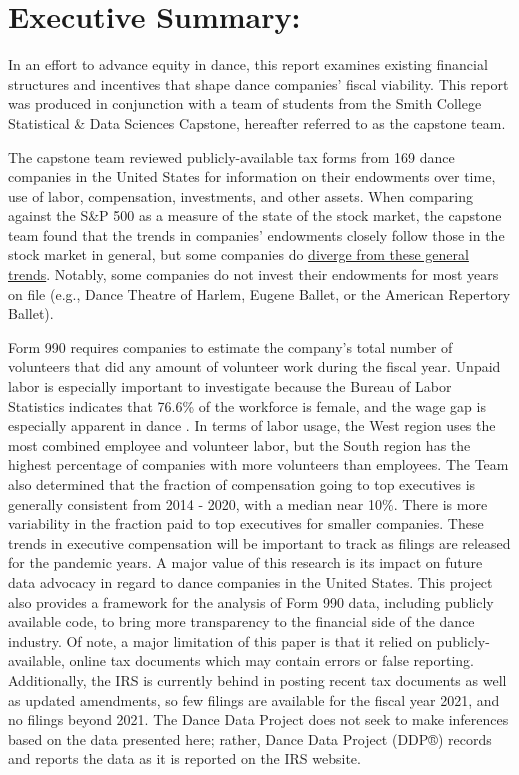 \documentclass[Dance Data
Project,article,submit,moreauthors,pdftex]{mdpi}
\begin{document}

\hypertarget{executive-summary}{%
\section{Executive Summary:}\label{executive-summary}}

In an effort to advance equity in dance, this report examines existing
financial structures and incentives that shape dance companies' fiscal
viability. This report was produced in conjunction with a team of
students from the Smith College Statistical \& Data Sciences Capstone,
hereafter referred to as the capstone team.

The capstone team reviewed publicly-available tax forms from 169 dance
companies in the United States for information on their endowments over
time, use of labor, compensation, investments, and other assets. When
comparing against the S\&P 500 as a measure of the state of the stock
market, the capstone team found that the trends in companies' endowments
closely follow those in the stock market in general, but some companies
do \protect\hyperlink{endowment-time}{diverge from these general
trends}. Notably, some companies do not invest their endowments for most
years on file (e.g., Dance Theatre of Harlem, Eugene Ballet, or the
American Repertory Ballet).

Form 990 requires companies to estimate the company's total number of
volunteers that did any amount of volunteer work during the fiscal year.
Unpaid labor is especially important to investigate because the Bureau
of Labor Statistics indicates that 76.6\% of the workforce is female,
and the wage gap is especially apparent in dance
\citep{jikar_gender_2022}. In terms of labor usage, the West region uses
the most combined employee and volunteer labor, but the South region has
the highest percentage of companies with more volunteers than employees.
The Team also determined that the fraction of compensation going to top
executives is generally consistent from 2014 - 2020, with a median near
10\%. There is more variability in the fraction paid to top executives
for smaller companies. These trends in executive compensation will be
important to track as filings are released for the pandemic years. A
major value of this research is its impact on future data advocacy in
regard to dance companies in the United States. This project also
provides a framework for the analysis of Form 990 data, including
publicly available code, to bring more transparency to the financial
side of the dance industry. Of note, a major limitation of this paper is
that it relied on publicly-available, online tax documents which may
contain errors or false reporting. Additionally, the IRS is currently
behind in posting recent tax documents as well as updated amendments, so
few filings are available for the fiscal year 2021, and no filings
beyond 2021. The Dance Data Project does not seek to make inferences
based on the data presented here; rather, Dance Data Project (DDP®)
records and reports the data as it is reported on the IRS website.
\end{document}
